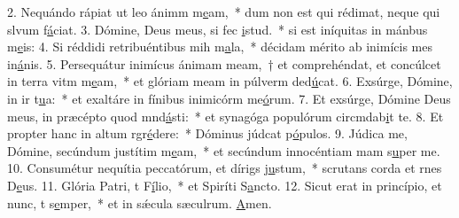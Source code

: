 2. Nequándo rápiat ut leo ánimm m\uline{e}am,~* dum non est qui rédimat, neque qui slvum f\uline{á}ciat.
3. Dómine, Deus meus, si fec \uline{i}stud.~* si est iníquitas in mánbus m\uline{e}is:
4. Si réddidi retribuéntibus mih m\uline{a}la,~* décidam mérito ab inimícis mes in\uline{á}nis.
5. Persequátur inimícus ánimam meam,~† et comprehéndat, et concúlcet in terra vitm m\uline{e}am,~* et glóriam meam in púlverm ded\uline{ú}cat.
6. Exsúrge, Dómine, in ir t\uline{u}a:~* et exaltáre in fínibus inimicórm me\uline{ó}rum.
7. Et exsúrge, Dómine Deus meus, in præcépto quod mnd\uline{á}sti:~* et synagóga populórum circmdab\uline{i}t te.
8. Et propter hanc in altum rgr\uline{é}dere:~* Dóminus júdcat p\uline{ó}pulos.
9. Júdica me, Dómine, secúndum justítim m\uline{e}am,~* et secúndum innocéntiam mam s\uline{u}per me.
10. Consumétur nequítia peccatórum, et dírigs j\uline{u}stum,~* scrutans corda et rnes D\uline{e}us.
11. Glória Patri, t F\uline{í}lio,~* et Spiríti S\uline{a}ncto.
12. Sicut erat in princípio, et nunc, t s\uline{e}mper,~* et in sǽcula sæculrum. \uline{A}men.
